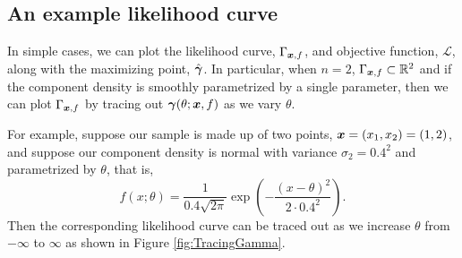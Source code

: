 	\subsection{An example likelihood curve}
		\label{sec:mixturelikelihoods:example}
		In simple cases, we can plot the likelihood curve, $\Gamma_{{\bm{{x}}}, f}$, and objective function, $\mathcal{L}$, along with the maximizing point, $\hat{{\bm{{\gamma}}}}$. In particular, when $n = 2$, $\Gamma_{{\bm{{x}}}, f} \subset \mathbb{R}^2$ and if the component density is smoothly parametrized by a single parameter, then we can plot $\Gamma_{{\bm{{x}}}, f}$ by tracing out ${\bm{{\gamma}}}(\theta; {\bm{{x}}}, f)$ as we vary $\theta$.

		For example, suppose our sample is made up of two points, ${\bm{{x}}} = (x_1, x_2) = (1,2)$, and suppose our component density is normal with variance $\sigma_2 = 0.4^2$ and parametrized by $\theta$, that is,
		\begin{equation}
		f(x;\theta) = \frac{1}{0.4 \sqrt{2 \pi}} \exp\left(-\frac{(x-\theta)^2}{2\cdot 0.4^2}\right).
		\label{eq:example component density for likelihood curve}
		\end{equation}
		Then the corresponding likelihood curve can be traced out as we increase $\theta$ from $-\infty$ to $\infty$ as shown in Figure \ref{fig:TracingGamma}. 

